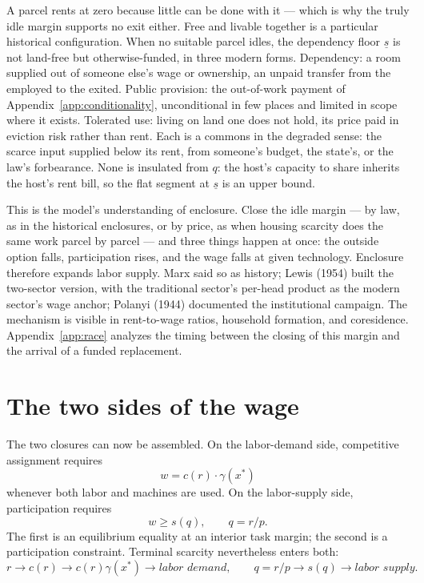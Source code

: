 \documentclass[12pt]{article}
\theoremstyle{plain}
\begin{document}
A parcel rents at zero because little can be done with it --- which is why the truly idle margin supports no exit either. Free and livable together is a particular historical configuration. When no suitable parcel idles, the dependency floor $\underline{s}$ is not land-free but otherwise-funded, in three modern forms. Dependency: a room supplied out of someone else's wage or ownership, an unpaid transfer from the employed to the exited. Public provision: the out-of-work payment of Appendix~\ref{app:conditionality}, unconditional in few places and limited in scope where it exists. Tolerated use: living on land one does not hold, its price paid in eviction risk rather than rent. Each is a commons in the degraded sense: the scarce input supplied below its rent, from someone's budget, the state's, or the law's forbearance. None is insulated from $q$: the host's capacity to share inherits the host's rent bill, so the flat segment at $\underline{s}$ is an upper bound.

This is the model's understanding of enclosure. Close the idle margin --- by law, as in the historical enclosures, or by price, as when housing scarcity does the same work parcel by parcel --- and three things happen at once: the outside option falls, participation rises, and the wage falls at given technology. Enclosure therefore expands labor supply. Marx said so as history; Lewis (1954) built the two-sector version, with the traditional sector's per-head product as the modern sector's wage anchor; Polanyi (1944) documented the institutional campaign. The mechanism is visible in rent-to-wage ratios, household formation, and coresidence. Appendix~\ref{app:race} analyzes the timing between the closing of this margin and the arrival of a funded replacement.

\section{The two sides of the wage}\label{sec:interval}

The two closures can now be assembled. On the labor-demand side, competitive
assignment requires
\[
w = c(r)\cdot\gamma(x^*)
\]
whenever both labor and machines are used. On the labor-supply side,
participation requires
\[
w \ge s(q), \qquad q=r/p.
\]
The first is an equilibrium equality at
an interior task margin; the second is a participation constraint. Terminal
scarcity nevertheless enters both:
\[
r
\to c(r)
\to c(r)\gamma(x^*)
\to \textit{labor demand},
\qquad
q=r/p
\to s(q)
\to \textit{labor supply}.
\]
\end{document}
